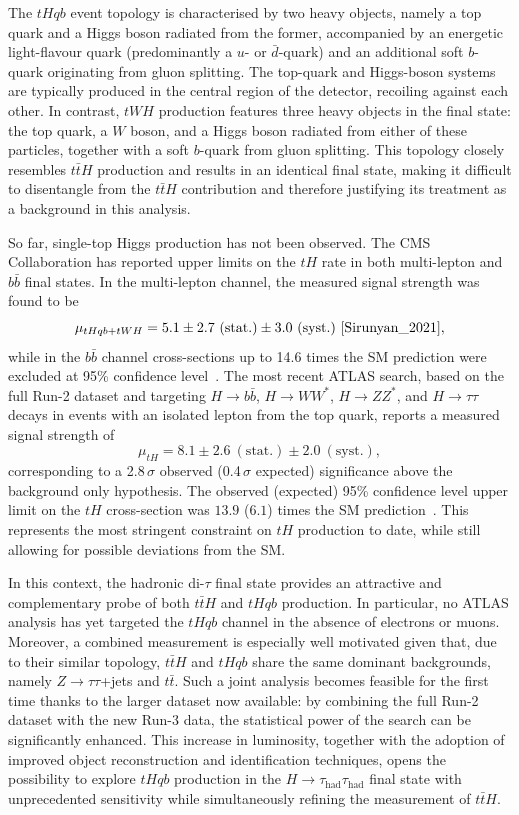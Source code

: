   The $tHqb$ event topology is characterised by two heavy objects, namely a top quark and a Higgs boson radiated from the former, accompanied by an energetic light-flavour quark (predominantly a $u$- or $\bar{d}$-quark) and an additional soft $b$-quark originating from gluon splitting. 
  The top-quark and Higgs-boson systems are typically produced in the central region of the detector, recoiling against each other. 
  In contrast, $tWH$ production features three heavy objects in the final state: the top quark, a $W$ boson, and a Higgs boson radiated from either of these particles, together with a soft $b$-quark from gluon splitting. 
  This topology closely resembles $t\bar{t}H$ production and results in an identical final state, making it difficult to disentangle from the $t\bar{t}H$ contribution and therefore justifying its treatment as a background in this analysis. 
  
  So far, single-top Higgs production has not been observed. 
  The CMS Collaboration has reported upper limits on the $tH$ rate in both multi-lepton and $b\bar{b}$ final states. 
  In the multi-lepton channel, the measured signal strength was found to be 
  \[
  \mu_{tHqb+tWH} = 5.1 \pm 2.7~(\text{stat.}) \pm 3.0~(\text{syst.})~\cite{Sirunyan_2021},
  \] 
  while in the $b\bar{b}$ channel cross-sections up to 14.6 times the SM prediction were excluded at 95\% confidence level~\cite{2025}. 
  The most recent ATLAS search, based on the full Run-2 dataset and targeting $H\to b\bar{b}$, $H\to WW^*$, $H\to ZZ^*$, and $H\to\tau\tau$ decays in events with an isolated lepton from the top quark, reports a measured signal strength of
  \[
  \mu_{tH} = 8.1 \pm 2.6~(\text{stat.}) \pm 2.0~(\text{syst.}),
  \] 
  corresponding to a 2.8\,$\sigma$ observed (0.4\,$\sigma$ expected) significance above the background only hypothesis. 
  The observed (expected) 95\% confidence level upper limit on the $tH$ cross-section was $13.9$ ($6.1$) times the SM prediction~\cite{ATLAS:2025irr}. 
  This represents the most stringent constraint on $tH$ production to date, while still allowing for possible deviations from the SM. 
  
  In this context, the hadronic di-$\tau$ final state provides an attractive and complementary probe of both $t\bar{t}H$ and $tHqb$ production. 
  In particular, no ATLAS analysis has yet targeted the $tHqb$ channel in the absence of electrons or muons. 
  Moreover, a combined measurement is especially well motivated given that, due to their similar topology, $t\bar{t}H$ and $tHqb$ share the same dominant backgrounds, namely $Z\to\tau\tau$+jets and $t\bar{t}$. 
  Such a joint analysis becomes feasible for the first time thanks to the larger dataset now available: by combining the full Run-2 dataset with the new Run-3 data, the statistical power of the search can be significantly enhanced. 
  This increase in luminosity, together with the adoption of improved object reconstruction and identification techniques, opens the possibility to explore $tHqb$ production in the $H\to\tau_{\mathrm{had}}\tau_{\mathrm{had}}$ final state with unprecedented sensitivity while simultaneously refining the measurement of $t\bar{t}H$.
  



